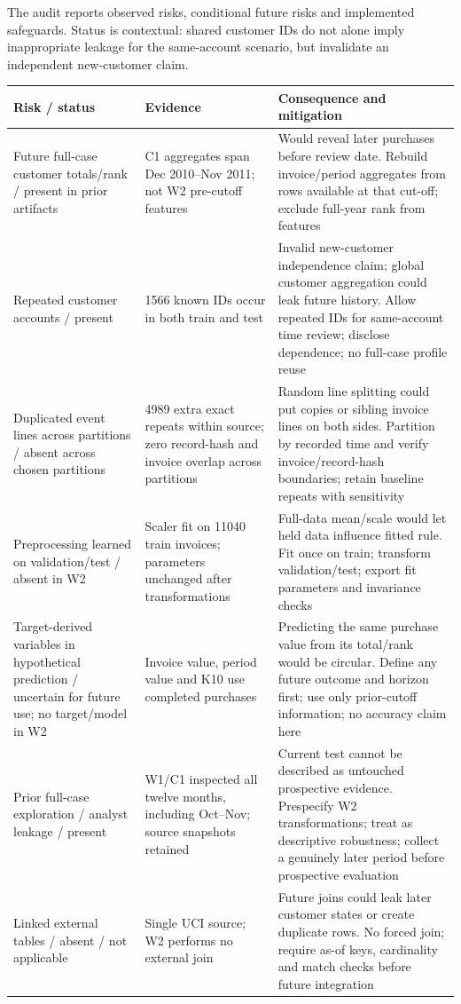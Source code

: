 \documentclass[10pt,a4paper]{article}
\newcommand{\sectionhead}[1]{\Needspace{8\baselineskip}\vspace{.4em}{\large\bfseries\color{navy}#1}\par\vspace{.1em}}
\begin{document}
\clearpage
\sectionhead{8\quad Context-specific leakage audit}
The audit reports observed risks, conditional future risks and implemented safeguards. Status is contextual: shared customer IDs do not alone imply inappropriate leakage for the same-account scenario, but invalidate an independent new-customer claim.

{\small
\begin{tabularx}{\linewidth}{@{}P{.23\linewidth}P{.27\linewidth}Y@{}}
\toprule
\textbf{Risk / status} & \textbf{Evidence} & \textbf{Consequence and mitigation} \\ \midrule
Future full-case customer totals/rank / present in prior artifacts & C1 aggregates span Dec 2010--Nov 2011; not W2 pre-cutoff features & Would reveal later purchases before review date. Rebuild invoice/period aggregates from rows available at that cut-off; exclude full-year rank from features \\
Repeated customer accounts / present & 1566 known IDs occur in both train and test & Invalid new-customer independence claim; global customer aggregation could leak future history. Allow repeated IDs for same-account time review; disclose dependence; no full-case profile reuse \\
Duplicated event lines across partitions / absent across chosen partitions & 4989 extra exact repeats within source; zero record-hash and invoice overlap across partitions & Random line splitting could put copies or sibling invoice lines on both sides. Partition by recorded time and verify invoice/record-hash boundaries; retain baseline repeats with sensitivity \\
Preprocessing learned on validation/test / absent in W2 & Scaler fit on 11040 train invoices; parameters unchanged after transformations & Full-data mean/scale would let held data influence fitted rule. Fit once on train; transform validation/test; export fit parameters and invariance checks \\
Target-derived variables in hypothetical prediction / uncertain for future use; no target/model in W2 & Invoice value, period value and K10 use completed purchases & Predicting the same purchase value from its total/rank would be circular. Define any future outcome and horizon first; use only prior-cutoff information; no accuracy claim here \\
Prior full-case exploration / analyst leakage / present & W1/C1 inspected all twelve months, including Oct--Nov; source snapshots retained & Current test cannot be described as untouched prospective evidence. Prespecify W2 transformations; treat as descriptive robustness; collect a genuinely later period before prospective evaluation \\
Linked external tables / absent / not applicable & Single UCI source; W2 performs no external join & Future joins could leak later customer states or create duplicate rows. No forced join; require as-of keys, cardinality and match checks before future integration \\
\bottomrule\end{tabularx}
}
\end{document}
